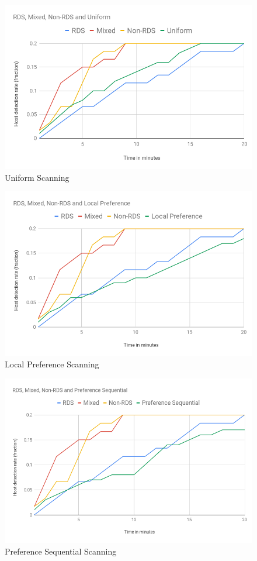 \FloatBarrier
\begin{figure}[!htbp]
\centering
  \includegraphics[scale=0.55]{Chap5/uniform.png}  \caption{Uniform Scanning}\label{fig:figure22}
\end{figure}
\FloatBarrier
\begin{figure}[!htbp]
\centering
  \includegraphics[scale=0.65]{Chap5/local.png}  \caption{Local Preference Scanning}\label{fig:figure23}
\end{figure}
\FloatBarrier
\begin{figure}[!htbp]
\centering
  \includegraphics[scale=0.7]{Chap5/prefseq.png}  \caption{Preference Sequential Scanning}\label{fig:figure24}
\end{figure}
